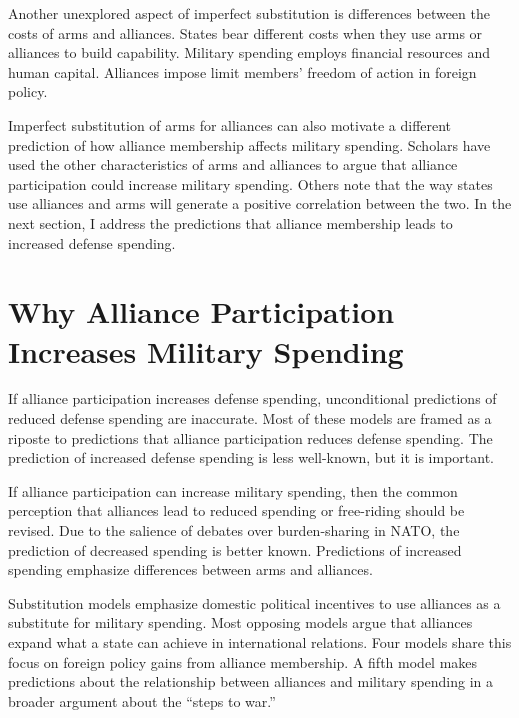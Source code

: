 \documentclass[12pt]{article}
\begin{document}
Another unexplored aspect of imperfect substitution is differences between the costs of arms and alliances. 
States bear different costs when they use arms or alliances to build capability.
Military spending employs financial resources and human capital. 
Alliances impose limit members' freedom of action in foreign policy. 


Imperfect substitution of arms for alliances can also motivate a different prediction of how alliance membership affects military spending.
Scholars have used the other characteristics of arms and alliances to argue that alliance participation could increase military spending.
Others note that the way states use alliances and arms will generate a positive correlation between the two. 
In the next section, I address the predictions that alliance membership leads to increased defense spending. 




\section{Why Alliance Participation Increases Military Spending}


If alliance participation increases defense spending, unconditional predictions of reduced defense spending are inaccurate. 
Most of these models are framed as a riposte to predictions that alliance participation reduces defense spending. 
The prediction of increased defense spending is less well-known, but it is important. 


If alliance participation can increase military spending, then the common perception that alliances lead to reduced spending or free-riding should be revised. 
Due to the salience of debates over burden-sharing in NATO, the prediction of decreased spending is better known. 
Predictions of increased spending emphasize differences between arms and alliances. 


Substitution models emphasize domestic political incentives to use alliances as a substitute for military spending.  
Most opposing models argue that alliances expand what a state can achieve in international relations. 
Four models share this focus on foreign policy gains from alliance membership. 
A fifth model makes predictions about the relationship between alliances and military spending in a broader argument about the ``steps to war.'' 
\end{document}
